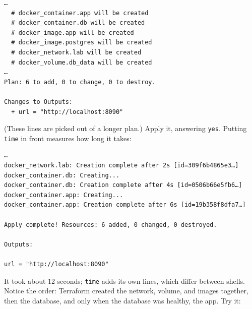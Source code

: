 \begin{codeblock}
\begin{Verbatim}[formatcom=\outputstyle]
…
  # docker_container.app will be created
  # docker_container.db will be created
  # docker_image.app will be created
  # docker_image.postgres will be created
  # docker_network.lab will be created
  # docker_volume.db_data will be created
…
Plan: 6 to add, 0 to change, 0 to destroy.

Changes to Outputs:
  + url = "http://localhost:8090"
\end{Verbatim}
\end{codeblock}


(These lines are picked out of a longer plan.) Apply it, answering \texttt{yes}. Putting \texttt{time} in front measures how long it takes:

\begin{codeblock}

\begin{Shaded}
\begin{Highlighting}[]
\end{Highlighting}
\end{Shaded}

\end{codeblock}

\begin{codeblock}
\begin{Verbatim}[formatcom=\outputstyle]
…
docker_network.lab: Creation complete after 2s [id=309f6b4865e3…]
docker_container.db: Creating...
docker_container.db: Creation complete after 4s [id=0506b66e5fb6…]
docker_container.app: Creating...
docker_container.app: Creation complete after 6s [id=19b358f8dfa7…]

Apply complete! Resources: 6 added, 0 changed, 0 destroyed.

Outputs:

url = "http://localhost:8090"
\end{Verbatim}
\end{codeblock}

It took about 12 seconds; \texttt{time} adds its own lines, which differ between shells. Notice the order: Terraform created the network, volume, and images together, then the database, and only when the database was healthy, the app. Try it:

\begin{codeblock}

\begin{Shaded}
\begin{Highlighting}[]
\end{Highlighting}
\end{Shaded}

\end{codeblock}

